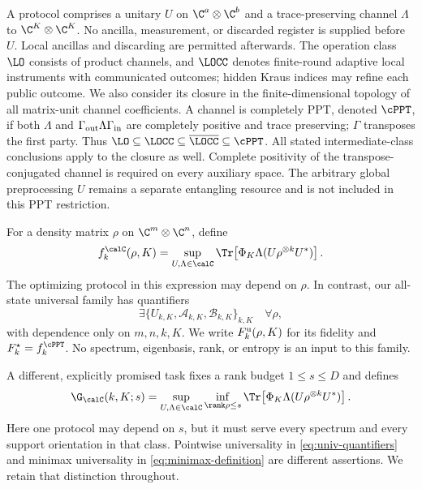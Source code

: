 A protocol comprises a unitary $U$ on $\C^a\otimes\C^b$ and a trace-preserving channel $\Lambda$ to $\C^K\otimes\C^K$. No ancilla, measurement, or discarded register is supplied before $U$. Local ancillas and discarding are permitted afterwards. The operation class $\LO$ consists of product channels, and $\LOCC$ denotes finite-round adaptive local instruments with communicated outcomes; hidden Kraus indices may refine each public outcome. We also consider its closure in the finite-dimensional topology of all matrix-unit channel coefficients. A channel is completely PPT, denoted $\cPPT$, if both $\Lambda$ and $\Gamma_{\rm out}\Lambda\Gamma_{\rm in}$ are completely positive and trace preserving; $\Gamma$ transposes the first party. Thus $\LO\subseteq\LOCC\subseteq\overline{\LOCC}\subseteq\cPPT$. All stated intermediate-class conclusions apply to the closure as well. Complete positivity of the transpose-conjugated channel is required on every auxiliary space. The arbitrary global preprocessing $U$ remains a separate entangling resource and is not included in this PPT restriction.

For a density matrix $\rho$ on $\C^m\otimes\C^n$, define
\begin{equation}\label{eq:state-aware}
 f_k^{\calC}(\rho,K)=\sup_{U,\Lambda\in\calC}
 \Tr\!\left[\Phi_K\Lambda(U\rho^{\otimes k}U^*)\right].
\end{equation}
The optimizing protocol in this expression may depend on $\rho$. In contrast, our all-state universal family has quantifiers
\begin{equation}\label{eq:univ-quantifiers}
 \exists\{U_{k,K},\mathcal A_{k,K},\mathcal B_{k,K}\}_{k,K}
 \quad\forall\rho,
\end{equation}
with dependence only on $m,n,k,K$. We write $F_k^{\rm u}(\rho,K)$ for its fidelity and $F_k^\star=f_k^{\cPPT}$. No spectrum, eigenbasis, rank, or entropy is an input to this family.

A different, explicitly promised task fixes a rank budget $1\le s\le D$ and defines
\begin{equation}\label{eq:minimax-definition}
 \G_{\calC}(k,K;s)=\sup_{U,\Lambda\in\calC}
 \inf_{\rank\rho\le s}\Tr\!\left[\Phi_K\Lambda(U\rho^{\otimes k}U^*)\right].
\end{equation}
Here one protocol may depend on $s$, but it must serve every spectrum and every support orientation in that class. Pointwise universality in \eqref{eq:univ-quantifiers} and minimax universality in \eqref{eq:minimax-definition} are different assertions. We retain that distinction throughout.

